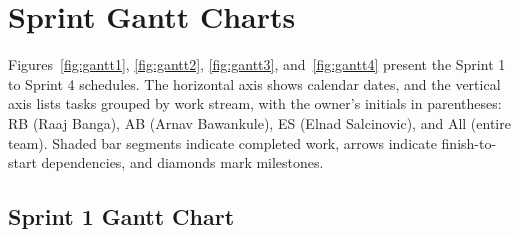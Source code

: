 \documentclass[12pt,letterpaper]{article}
\begin{document}
\section{Sprint Gantt Charts}
Figures~\ref{fig:gantt1}, \ref{fig:gantt2}, \ref{fig:gantt3}, and~\ref{fig:gantt4}
present the Sprint 1 to Sprint 4 schedules. The horizontal axis shows calendar dates, and the vertical axis lists tasks
grouped by work stream, with the owner's initials in parentheses: RB (Raaj Banga), AB
(Arnav Bawankule), ES (Elnad Salcinovic), and All (entire team). Shaded bar segments
indicate completed work, arrows indicate finish-to-start dependencies, and diamonds
mark milestones.

\subsection{Sprint 1 Gantt Chart}
\end{document}
